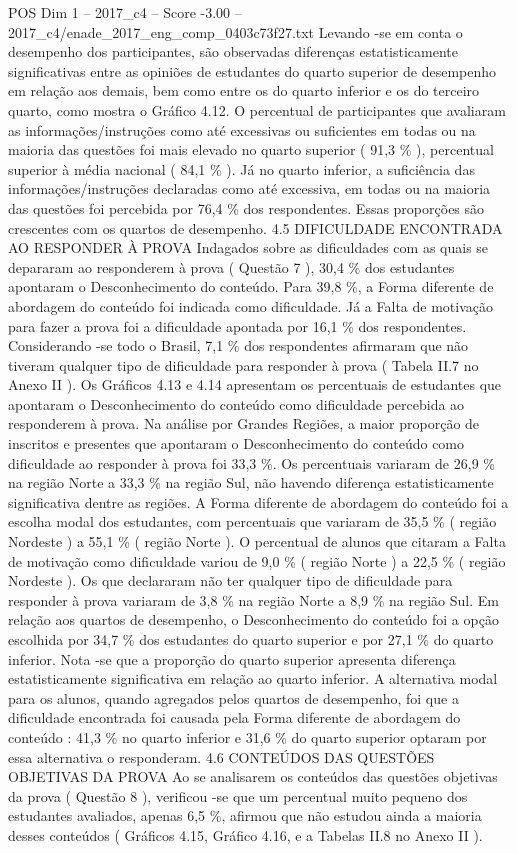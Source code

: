 \begin{textsample}{POS Dim 1 – 2017\_c4 – Score -3.00 – 2017\_c4/enade\_2017\_eng\_comp\_0403c73f27.txt}
Levando -se em conta o desempenho dos participantes, são observadas diferenças estatisticamente significativas entre as opiniões de estudantes do quarto superior de desempenho em relação aos demais, bem como entre os do quarto inferior e os do terceiro quarto, como mostra o Gráfico 4.12.
O percentual de participantes que avaliaram as informações/instruções como até excessivas ou suficientes em todas ou na maioria das questões foi mais elevado no quarto superior ( 91,3 \% ), percentual superior à média nacional ( 84,1 \% ).
Já no quarto inferior, a suficiência das informações/instruções declaradas como até excessiva, em todas ou na maioria das questões foi percebida por 76,4 \% dos respondentes.
Essas proporções são crescentes com os quartos de desempenho. 4.5 DIFICULDADE ENCONTRADA AO RESPONDER À PROVA Indagados sobre as dificuldades com as quais se depararam ao responderem à prova ( Questão 7 ), 30,4 \% dos estudantes apontaram o Desconhecimento do conteúdo.
Para 39,8 \%, a Forma diferente de abordagem do conteúdo foi indicada como dificuldade.
Já a Falta de motivação para fazer a prova foi a dificuldade apontada por 16,1 \% dos respondentes.
Considerando -se todo o Brasil, 7,1 \% dos respondentes afirmaram que não tiveram qualquer tipo de dificuldade para responder à prova ( Tabela II.7 no Anexo II ).
Os Gráficos 4.13 e 4.14 apresentam os percentuais de estudantes que apontaram o Desconhecimento do conteúdo como dificuldade percebida ao responderem à prova.
Na análise por Grandes Regiões, a maior proporção de inscritos e presentes que apontaram o Desconhecimento do conteúdo como dificuldade ao responder à prova foi 33,3 \%.
Os percentuais variaram de 26,9 \% na região Norte a 33,3 \% na região Sul, não havendo diferença estatisticamente significativa dentre as regiões.
A Forma diferente de abordagem do conteúdo foi a escolha modal dos estudantes, com percentuais que variaram de 35,5 \% ( região Nordeste ) a 55,1 \% ( região Norte ).
O percentual de alunos que citaram a Falta de motivação como dificuldade variou de 9,0 \% ( região Norte ) a 22,5 \% ( região Nordeste ).
Os que declararam não ter qualquer tipo de dificuldade para responder à prova variaram de 3,8 \% na região Norte a 8,9 \% na região Sul.
Em relação aos quartos de desempenho, o Desconhecimento do conteúdo foi a opção escolhida por 34,7 \% dos estudantes do quarto superior e por 27,1 \% do quarto inferior.
Nota -se que a proporção do quarto superior apresenta diferença estatisticamente significativa em relação ao quarto inferior.
A alternativa modal para os alunos, quando agregados pelos quartos de desempenho, foi que a dificuldade encontrada foi causada pela Forma diferente de abordagem do conteúdo : 41,3 \% no quarto inferior e 31,6 \% do quarto superior optaram por essa alternativa o responderam. 4.6 CONTEÚDOS DAS QUESTÕES OBJETIVAS DA PROVA Ao se analisarem os conteúdos das questões objetivas da prova ( Questão 8 ), verificou -se que um percentual muito pequeno dos estudantes avaliados, apenas 6,5 \%, afirmou que não estudou ainda a maioria desses conteúdos ( Gráficos 4.15, Gráfico 4.16, e a Tabelas II.8 no Anexo II ).

\end{textsample}
